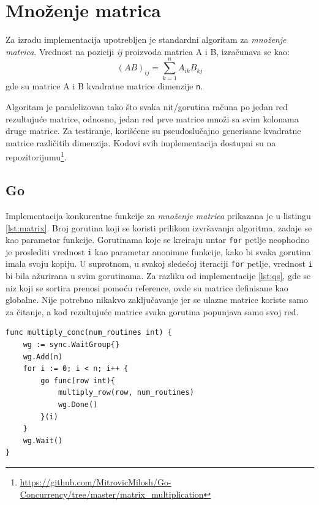 \documentclass[12pt,oneside]{memoir}
\begin{document}

\section{Množenje matrica}
Za izradu implementacija upotrebljen je standardni algoritam za \textit{množenje matrica}. Vrednost na poziciji \textit{ij} proizvoda matrica A i B, izračunava se kao: $$(AB)_{ij} = \sum_{k=1}^{n} A_{ik}B_{kj}$$ gde su matrice A i B kvadratne matrice dimenzije \texttt{n}.

Algoritam je paralelizovan tako što svaka nit/gorutina računa po jedan red rezultujuće matrice, odnosno, jedan red prve matrice množi sa svim kolonama druge matrice. Za testiranje, korišćene su pseudoslučajno generisane kvadratne matrice različitih dimenzija. Kodovi svih implementacija dostupni su na repozitorijumu\footnote{\url{https://github.com/MitrovicMilosh/Go-Concurrency/tree/master/matrix_multiplication}}.

\subsection{Go}
Implementacija konkurentne funkcije za \textit{množenje matrica} prikazana je u listingu \ref{lst:matrix}. Broj gorutina koji se koristi prilikom izvršavanja algoritma, zadaje se kao parametar funkcije. Gorutinama koje se kreiraju untar \texttt{for} petlje neophodno je proslediti vrednost \texttt{i} kao parametar anonimne funkcije, kako bi svaka gorutina imala svoju kopiju. U suprotnom, u svakoj sledećoj iteraciji \texttt{for} petlje, vrednost \texttt{i} bi bila ažurirana u svim gorutinama. Za razliku od  implementacije \ref{lst:qs}, gde se niz koji se sortira prenosi pomoću reference, ovde su matrice definisane kao globalne. Nije potrebno nikakvo zaključavanje jer se ulazne matrice koriste samo za čitanje, a kod rezultujuće matrice svaka gorutina popunjava samo svoj red. 

\begin{center}
\begin{lstlisting}[caption=Implementacija konkurentne funkcije za \textit{množenje matrica} u jeziku Go,label={lst:matrix}, backgroundcolor=\color{background}]
func multiply_conc(num_routines int) {
	wg := sync.WaitGroup{}
	wg.Add(n)
	for i := 0; i < n; i++ {
		go func(row int){
			multiply_row(row, num_routines)
			wg.Done()
		}(i)
	}
	wg.Wait()
}
\end{lstlisting}
\end{center}
\end{document}
